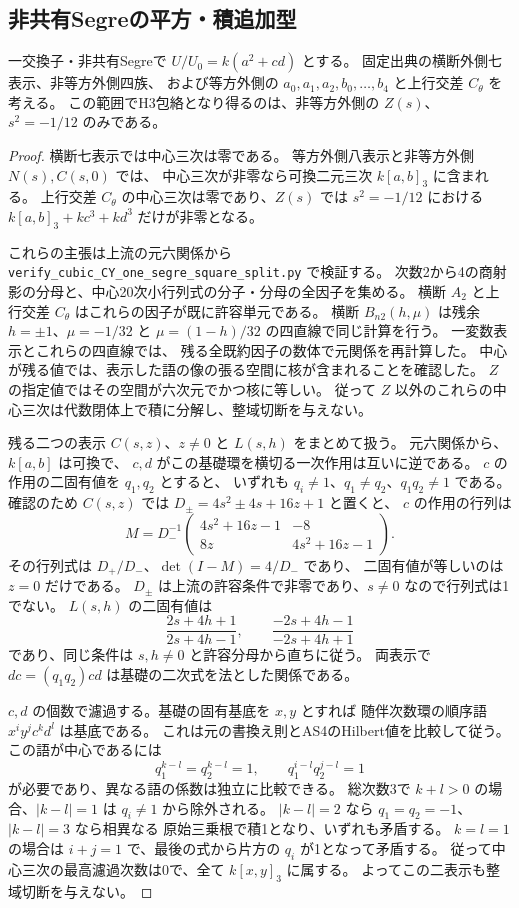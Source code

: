\subsection{非共有Segreの平方・積追加型}
\label{subsec:cubic-CY-one-segre-square-split}

\begin{proposition}\label{prop:cubic-CY-one-segre-square-split-outer}
一交換子・非共有Segreで $U/U_0=k(a^2+cd)$ とする。
固定出典\cite{AS4CYpinned}の横断外側七表示、非等方外側四族、
および等方外側の $a_0,a_1,a_2,b_0,\ldots,b_4$ と上行交差 $C_\theta$ を考える。
この範囲でH3包絡となり得るのは、非等方外側の $Z(s)$、
$s^2=-1/12$ のみである。
\end{proposition}
\begin{proof}
横断七表示では中心三次は零である。
等方外側八表示と非等方外側 $N(s),C(s,0)$ では、
中心三次が非零なら可換二元三次 $k[a,b]_3$ に含まれる。
上行交差 $C_\theta$ の中心三次は零であり、$Z(s)$ では
$s^2=-1/12$ における $k[a,b]_3+kc^3+kd^3$ だけが非零となる。

これらの主張は上流の元六関係から
\texttt{verify\_cubic\_CY\_one\_segre\_square\_split.py} で検証する。
次数2から4の商射影の分母と、中心20次小行列式の分子・分母の全因子を集める。
横断 $A_2$ と上行交差 $C_\theta$ はこれらの因子が既に許容単元である。
横断 $B_{n2}(h,\mu)$ は残余 $h=\pm1$、$\mu=-1/32$ と
$\mu=(1-h)/32$ の四直線で同じ計算を行う。
一変数表示とこれらの四直線では、
残る全既約因子の数体で元関係を再計算した。
中心が残る値では、表示した語の像の張る空間に核が含まれることを確認した。
$Z$ の指定値ではその空間が六次元でかつ核に等しい。
従って $Z$ 以外のこれらの中心三次は代数閉体上で積に分解し、整域切断を与えない。

残る二つの表示 $C(s,z)$、$z\ne0$ と $L(s,h)$ をまとめて扱う。
元六関係から、$k[a,b]$ は可換で、
$c,d$ がこの基礎環を横切る一次作用は互いに逆である。
$c$ の作用の二固有値を $q_1,q_2$ とすると、
いずれも $q_i\ne1$、$q_1\ne q_2$、$q_1q_2\ne1$ である。
確認のため $C(s,z)$ では $D_\pm=4s^2\pm4s+16z+1$ と置くと、
$c$ の作用の行列は
\[
 M=D_-^{-1}\begin{pmatrix}4s^2+16z-1&-8\\8z&4s^2+16z-1\end{pmatrix}.
\]
その行列式は $D_+/D_-$、$\det(I-M)=4/D_-$ であり、
二固有値が等しいのは $z=0$ だけである。
$D_\pm$ は上流の許容条件で非零であり、$s\ne0$ なので行列式は1でない。
$L(s,h)$ の二固有値は
\[
 \frac{2s+4h+1}{2s+4h-1},\qquad
 \frac{-2s+4h-1}{-2s+4h+1}
\]
であり、同じ条件は $s,h\ne0$ と許容分母から直ちに従う。
両表示で $dc=(q_1q_2)cd$ は基礎の二次式を法とした関係である。

$c,d$ の個数で濾過する。基礎の固有基底を $x,y$ とすれば
随伴次数環の順序語 $x^i y^j c^k d^l$ は基底である。
これは元の書換え則とAS4のHilbert値を比較して従う。
この語が中心であるには
\[
 q_1^{k-l}=q_2^{k-l}=1,\qquad q_1^{i-l}q_2^{j-l}=1
\]
が必要であり、異なる語の係数は独立に比較できる。
総次数3で $k+l>0$ の場合、$|k-l|=1$ は $q_i\ne1$ から除外される。
$|k-l|=2$ なら $q_1=q_2=-1$、$|k-l|=3$ なら相異なる
原始三乗根で積1となり、いずれも矛盾する。
$k=l=1$ の場合は $i+j=1$ で、最後の式から片方の $q_i$ が1となって矛盾する。
従って中心三次の最高濾過次数は0で、全て $k[x,y]_3$ に属する。
よってこの二表示も整域切断を与えない。
\end{proof}

